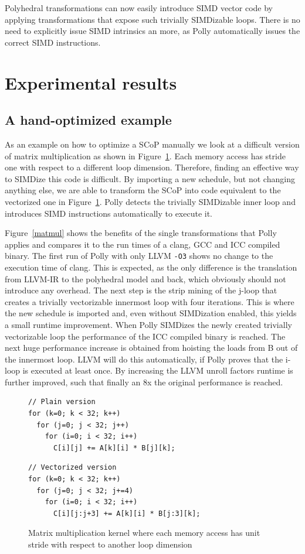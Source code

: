 \documentclass{acm_proc_article-sp}
\begin{document}
Polyhedral transformations can now easily introduce SIMD vector code by applying
transformations that expose such trivially SIMDizable loops. There is no need
to explicitly issue SIMD intrinsics an more, as Polly automatically issues the
correct SIMD instructions.

\section{Experimental results}

\subsection{A hand-optimized example}
As an example on how to optimize a SCoP manually we look at a difficult version
of matrix multiplication as shown in Figure~\ref{lst:matmul}. Each memory
access has stride one with respect to a different loop dimension. Therefore,
finding an effective way to SIMDize this code is difficult.
By importing a new schedule, but not changing anything else, we are able
to transform the SCoP into code equivalent to the vectorized one in
Figure~\ref{lst:matmul}. Polly detects the
trivially SIMDizable inner loop and introduces SIMD instructions automatically
to execute it.

Figure~\ref{matmul} shows the benefits of the
single transformations that Polly applies and compares it to the run times
of a clang, GCC and ICC compiled binary. The first run of Polly with only LLVM \texttt{-O3}
shows no change to the execution time of clang. This is expected, as the only difference
is the translation from LLVM-IR to the polyhedral model and back, which obviously should not
introduce any overhead. The next step is the strip mining of the j-loop that
creates a trivially vectorizable innermost loop with four iterations. This is where the new schedule
is imported and, even without SIMDization enabled, this yields a small runtime
improvement. When Polly SIMDizes the newly created trivially vectorizable loop
the performance of the ICC compiled binary is reached.  The next huge
performance increase is obtained from hoisting the loads from B out of the
innermost loop. LLVM will do this automatically,
if Polly proves that the i-loop is executed at least once. By increasing the
LLVM unroll factors runtime is further improved, such that finally
an 8x the original performance is reached.

\begin{figure}
\begin{verbatim}
// Plain version
for (k=0; k < 32; k++)
  for (j=0; j < 32; j++)
    for (i=0; i < 32; i++)
      C[i][j] += A[k][i] * B[j][k];
\end{verbatim}

\label{lst:matmulVec}
\begin{verbatim}
// Vectorized version
for (k=0; k < 32; k++)
  for (j=0; j < 32; j+=4)
    for (i=0; i < 32; i++)
      C[i][j:j+3] += A[k][i] * B[j:3][k];
\end{verbatim}
\caption{Matrix multiplication kernel where each memory access has unit stride
	 with respect to another loop dimension}
\label{lst:matmul}
\end{figure}
\end{document}

